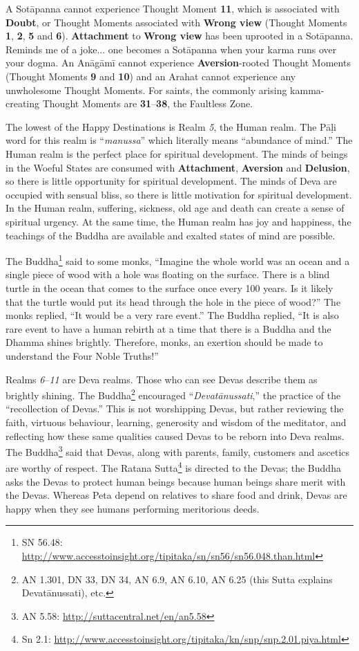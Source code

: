 A Sotāpanna cannot experience Thought Moment \textbf{11}, which is associated with \textbf{Doubt}, or Thought Moments associated with \textbf{Wrong view} (Thought Moments \textbf{1}, \textbf{2}, \textbf{5} and \textbf{6}). \textbf{Attachment} to \textbf{Wrong view} has been uprooted in a Sotāpanna. Reminds me of a joke... one becomes a Sotāpanna when your karma runs over your dogma. An Anāgāmī cannot experience \textbf{Aversion}-rooted Thought Moments (Thought Moments \textbf{9} and \textbf{10}) and an Arahat cannot experience any unwholesome Thought Moments. For saints, the commonly arising kamma-creating Thought Moments are \textbf{31}--\textbf{38}, the Faultless Zone.

The lowest of the Happy Destinations is Realm \textit{5}, the Human realm. The Pāḷi word for this realm is “\textit{manussa}” which literally means “abundance of mind.” The Human realm is the perfect place for spiritual development. The minds of beings in the Woeful States are consumed with \textbf{Attachment}, \textbf{Aversion} and \textbf{Delusion}, so there is little opportunity for spiritual development. The minds of Deva are occupied with sensual bliss, so there is little motivation for spiritual development. In the Human realm, suffering, sickness, old age and death can create a sense of spiritual urgency. At the same time, the Human realm has joy and happiness, the teachings of the Buddha are available and exalted states of mind are possible.

The Buddha\footnote{SN 56.48: \url{http://www.accesstoinsight.org/tipitaka/sn/sn56/sn56.048.than.html}} said to some monks, “Imagine the whole world was an ocean and a single piece of wood with a hole was floating on the surface. There is a blind turtle in the ocean that comes to the surface once every 100 years. Is it likely that the turtle would put its head through the hole in the piece of wood?” The monks replied, “It would be a very rare event.” The Buddha replied, “It is also rare event to have a human rebirth at a time that there is a Buddha and the Dhamma shines brightly. Therefore, monks, an exertion should be made to understand the Four Noble Truths!”

Realms \textit{6}--\textit{11} are Deva realms. Those who can see Devas describe them as brightly shining. The Buddha\footnote{AN 1.301, DN 33, DN 34, AN 6.9, AN 6.10, AN 6.25 (this Sutta explains Devatānussati), etc.} encouraged “\textit{Devatānussati},” the practice of the “recollection of Devas.” This is not worshipping Devas, but rather reviewing the faith, virtuous behaviour, learning, generosity and wisdom of the meditator, and reflecting how these same qualities caused Devas to be reborn into Deva realms. The Buddha\footnote{AN 5.58: \url{http://suttacentral.net/en/an5.58}} said that Devas, along with parents, family, customers and ascetics are worthy of respect. The Ratana Sutta\footnote{Sn 2.1: \url{http://www.accesstoinsight.org/tipitaka/kn/snp/snp.2.01.piya.html}} is directed to the Devas; the Buddha asks the Devas to protect human beings because human beings share merit with the Devas. Whereas Peta depend on relatives to share food and drink, Devas are happy when they see humans performing meritorious deeds.

